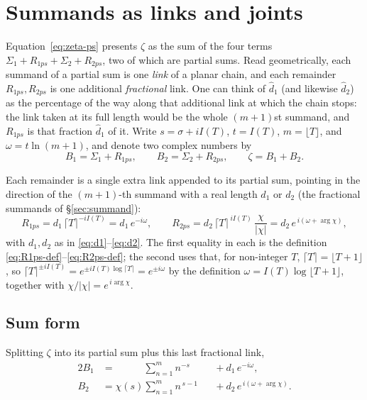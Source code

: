\documentclass[11pt]{article}
\theoremstyle{definition}
\begin{document}
\section{Summands as links and joints}\label{sec:matrix-product}

Equation~\eqref{eq:zeta-ps} presents $\zeta$ as the sum of the four terms
$\Sigma_1+R_{1ps}+\Sigma_2+R_{2ps}$, two of which are partial sums. Read geometrically, each summand of a
partial sum is one \emph{link} of a planar chain, and each remainder
$R_{1ps},R_{2ps}$ is one additional \emph{fractional} link. One can think
of $\hat d_1$ (and likewise $\hat d_2$) as the percentage of the way along
that additional link at which the chain stops: the link taken at its full
length would be the whole $(m+1)$st summand, and $R_{1ps}$ is that
fraction $\hat d_1$ of it. Write $s=\sigma+iI(T)$,
$t=I(T)$, $m=\lfloor T\rfloor$, and $\omega=t\ln(m+1)$, and denote two complex numbers by
\begin{equation}
B_1=\Sigma_1+R_{1ps},\qquad B_2=\Sigma_2+R_{2ps},\qquad \zeta=B_1+B_2 .
\end{equation}

Each remainder is a single extra link appended to its partial sum,
pointing in the direction of the $(m+1)$-th summand with a real length $d_1$ or
$d_2$ (the fractional summands of \S\ref{sec:summand}):
\begin{equation}\label{eq:R-phasors}
R_{1ps}=d_1\,\lceil T\rceil^{-iI(T)}=d_1\,e^{-i\omega},\qquad
R_{2ps}=d_2\,\lceil T\rceil^{\,iI(T)}\,\frac{\chi}{|\chi|}=d_2\,e^{\,i(\omega+\arg\chi)},
\end{equation}
with $d_1,d_2$ as in \eqref{eq:d1}--\eqref{eq:d2}. The first equality in each is
the definition \eqref{eq:R1ps-def}--\eqref{eq:R2ps-def}; the second uses that, for
non-integer $T$, $\lceil T\rceil=\lfloor T+1\rfloor$, so
$\lceil T\rceil^{\pm iI(T)}=e^{\pm iI(T)\log\lceil T\rceil}=e^{\pm i\omega}$ by the
definition $\omega=I(T)\log\lfloor T+1\rfloor$, together with
$\chi/|\chi|=e^{\,i\arg\chi}$.

\subsection{Sum form}\label{sec:sum-form}

Splitting $\zeta$ into its partial sum plus this last
fractional link,
\begin{alignat}{2}
B_1 &= \phantom{\chi(s)}\sum_{n=1}^{m} n^{-s}    &&{}+ d_1\,e^{-i\omega}, \label{eq:B1-sum}\\
B_2 &= \chi(s)\sum_{n=1}^{m} n^{\,s-1}           &&{}+ d_2\,e^{\,i(\omega+\arg\chi)}. \label{eq:B2-sum}
\end{alignat}
\end{document}
